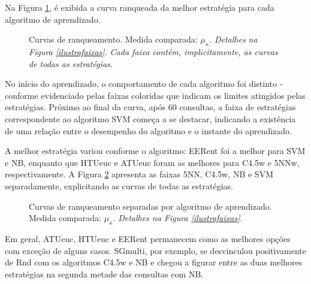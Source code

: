 Na Figura \ref{curvasrankbands}, é exibida a curva ranqueada da melhor estratégia para cada algoritmo de aprendizado.
\begin{figure}
	\centering
	
	\caption[Curvas de ranqueamento ($\mu_{\kappa}$).]{Curvas de ranqueamento. Medida comparada: $\mu_{\kappa}$. \textit{Detalhes na Figura \ref{ilustrafaixas}.} \textit{Cada faixa contém, implicitamente, as curvas de todas as estratégias.}}
	\label{curvasrankbands}
\end{figure}
No início do aprendizado, o comportamento de cada algoritmo foi distinto - conforme evidenciado pelas faixas coloridas que indicam os limites atingidos pelas estratégias.
Próximo ao final da curva, após 60 consultas, a faixa de estratégias correspondente ao algoritmo SVM começa a se destacar, indicando a existência de uma relação entre o desempenho do algoritmo e o instante do aprendizado.

A melhor estratégia variou conforme o algoritmo: EERent foi a melhor para SVM e NB, enquanto que HTUeuc e ATUeuc foram as melhores para C4.5w e 5NNw, respectivamente.
A Figura \ref{separadas} apresenta as faixas 5NN, C4.5w, NB e SVM separadamente, explicitando as curvas de todas as estratégias.
\begin{figure}
\centering
	
	
	
	
\caption[Curvas de ranqueamento por algoritmo de aprendizado ($\mu_{\kappa}$).]{Curvas de ranqueamento separadas por algoritmo de aprendizado. Medida comparada: $\mu_{\kappa}$. \textit{Detalhes na Figura \ref{ilustrafaixas}.}}
\label{separadas}
\end{figure}
Em geral, ATUeuc, HTUeuc e EERent permanecem como as melhores opções com exceção de alguns casos.
SGmulti, por exemplo, se desvinculou positivamente de Rnd com os algoritmos C4.5w e NB e chegou a figurar entre as duas melhores estratégias na segunda metade das consultas com NB.

